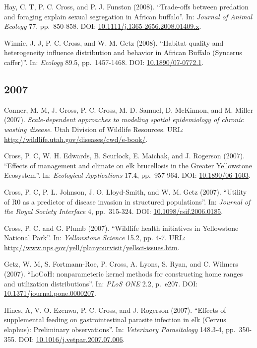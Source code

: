 \documentclass[12pt,]{article}
\begin{document}
Hay, C. T, P. C. Cross, and P. J. Funston (2008). ``Trade-offs between
predation and foraging explain sexual segregation in African buffalo''.
In: \emph{Journal of Animal Ecology} 77, pp.~850-858. DOI:
\href{https://doi.org/10.1111\%2Fj.1365-2656.2008.01409.x}{10.1111/j.1365-2656.2008.01409.x}.

Winnie, J. J, P. C. Cross, and W. M. Getz (2008). ``Habitat quality and
heterogeneity influence distribution and behavior in African Buffalo
(Syncerus caffer)''. In: \emph{Ecology} 89.5, pp.~1457-1468. DOI:
\href{https://doi.org/10.1890\%2F07-0772.1}{10.1890/07-0772.1}.

\hypertarget{section-12}{%
\subsection{2007}\label{section-12}}

Conner, M. M, J. Gross, P. C. Cross, M. D. Samuel, D. McKinnon, and M.
Miller (2007). \emph{Scale-dependent approaches to modeling spatial
epidemiology of chronic wasting disease}. Utah Division of Wildlife
Resources. URL: \url{http://wildlife.utah.gov/diseases/cwd/e-book/}.

Cross, P. C, W. H. Edwards, B. Scurlock, E. Maichak, and J. Rogerson
(2007). ``Effects of management and climate on elk brucellosis in the
Greater Yellowstone Ecosystem''. In: \emph{Ecological Applications}
17.4, pp.~957-964. DOI:
\href{https://doi.org/10.1890\%2F06-1603}{10.1890/06-1603}.

Cross, P. C, P. L. Johnson, J. O. Lloyd-Smith, and W. M. Getz (2007).
``Utility of R0 as a predictor of disease invasion in structured
populations''. In: \emph{Journal of the Royal Society Interface} 4,
pp.~315-324. DOI:
\href{https://doi.org/10.1098\%2Frsif.2006.0185}{10.1098/rsif.2006.0185}.

Cross, P. C. and G. Plumb (2007). ``Wildlife health initiatives in
Yellowstone National Park''. In: \emph{Yellowstone Science} 15.2, pp.
4-7. URL:
\url{http://www.nps.gov/yell/planyourvisit/yellsci-issues.htm}.

Getz, W. M, S. Fortmann-Roe, P. Cross, A. Lyons, S. Ryan, and C. Wilmers
(2007). ``LoCoH: nonparameteric kernel methods for constructing home
ranges and utilization distributions''. In: \emph{PLoS ONE} 2.2,
p.~e207. DOI:
\href{https://doi.org/10.1371\%2Fjournal.pone.0000207}{10.1371/journal.pone.0000207}.

Hines, A, V. O. Ezenwa, P. C. Cross, and J. Rogerson (2007). ``Effects
of supplemental feeding on gastrointestinal parasite infection in elk
(Cervus elaphus): Preliminary observations''. In: \emph{Veterinary
Parasitology} 148.3-4, pp.~350-355. DOI:
\href{https://doi.org/10.1016\%2Fj.vetpar.2007.07.006}{10.1016/j.vetpar.2007.07.006}.
\end{document}
